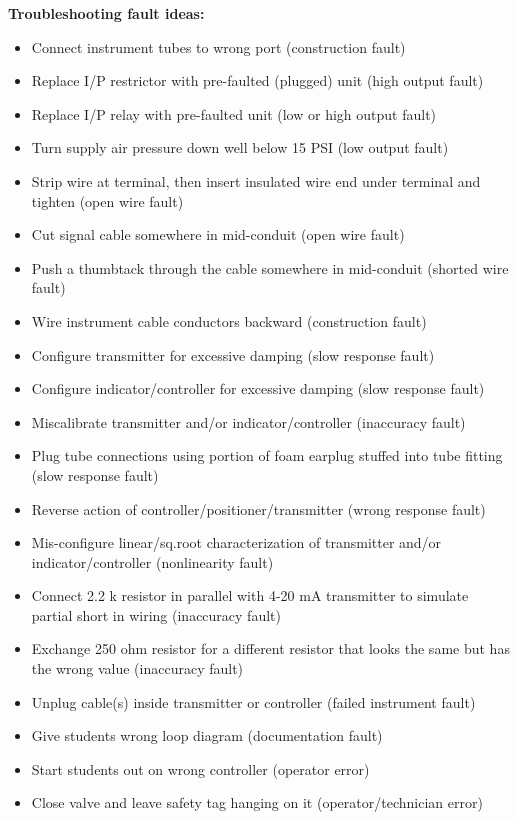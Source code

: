 \begin{itemize}
\noindent
{\bf Troubleshooting fault ideas:}

\begin{itemize}
\goodbreak
\item{} Connect instrument tubes to wrong port (construction fault)
\item{} Replace I/P restrictor with pre-faulted (plugged) unit (high output fault)
\item{} Replace I/P relay with pre-faulted unit (low or high output fault)
\item{} Turn supply air pressure down well below 15 PSI (low output fault)
\item{} Strip wire at terminal, then insert insulated wire end under terminal and tighten (open wire fault)
\item{} Cut signal cable somewhere in mid-conduit (open wire fault)
\item{} Push a thumbtack through the cable somewhere in mid-conduit (shorted wire fault)
\item{} Wire instrument cable conductors backward (construction fault)
\item{} Configure transmitter for excessive damping (slow response fault)
\item{} Configure indicator/controller for excessive damping (slow response fault)
\item{} Miscalibrate transmitter and/or indicator/controller (inaccuracy fault)
\item{} Plug tube connections using portion of foam earplug stuffed into tube fitting (slow response fault)
\item{} Reverse action of controller/positioner/transmitter (wrong response fault)
\item{} Mis-configure linear/sq.root characterization of transmitter and/or indicator/controller (nonlinearity fault)
\item{} Connect 2.2 k resistor in parallel with 4-20 mA transmitter to simulate partial short in wiring (inaccuracy fault)
\item{} Exchange 250 ohm resistor for a different resistor that looks the same but has the wrong value (inaccuracy fault) 
\item{} Unplug cable(s) inside transmitter or controller (failed instrument fault)
\item{} Give students wrong loop diagram (documentation fault)
\item{} Start students out on wrong controller (operator error)
\item{} Close valve and leave safety tag hanging on it (operator/technician error)
\end{itemize}










\end{itemize}
